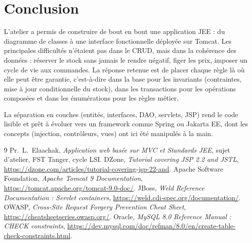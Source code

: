 \documentclass[11pt,a4paper]{report}
\begin{document}
\chapter*{Conclusion}
L'atelier a permis de construire de bout en bout une application JEE : du diagramme de classes \`a une interface fonctionnelle d\'eploy\'ee sur Tomcat. Les principales difficult\'es n'\'etaient pas dans le CRUD, mais dans la coh\'erence des donn\'ees : r\'eserver le stock sans jamais le rendre n\'egatif, figer les prix, imposer un cycle de vie aux commandes. La r\'eponse retenue est de placer chaque r\`egle l\`a o\`u elle peut \^etre garantie, c'est-\`a-dire dans la base pour les invariants (contraintes, mise \`a jour conditionnelle du stock), dans les transactions pour les op\'erations compos\'ees et dans les \'enum\'erations pour les r\`egles m\'etier.

La s\'eparation en couches (entit\'es, interfaces, DAO, servlets, JSP) rend le code lisible et pr\^et \`a \'evoluer vers un framework comme Spring ou Jakarta EE, dont les concepts (injection, contr\^oleurs, vues) ont ici \'et\'e manipul\'es \`a la main.

\begin{thebibliography}{9}
 Pr.\ L.\ Elaachak, \emph{Application web bas\'ee sur MVC et Standards JEE}, sujet d'atelier, FST Tanger, cycle LSI.
 DZone, \emph{Tutorial covering JSP 2.2 and JSTL}, \url{https://dzone.com/articles/tutorial-covering-jsp-22-and}.
 Apache Software Foundation, \emph{Apache Tomcat 9 Documentation}, \url{https://tomcat.apache.org/tomcat-9.0-doc/}.
 JBoss, \emph{Weld Reference Documentation : Servlet containers}, \url{https://weld.cdi-spec.org/documentation/}.
 OWASP, \emph{Cross-Site Request Forgery Prevention Cheat Sheet}, \url{https://cheatsheetseries.owasp.org/}.
 Oracle, \emph{MySQL 8.0 Reference Manual : CHECK constraints}, \url{https://dev.mysql.com/doc/refman/8.0/en/create-table-check-constraints.html}.
\end{thebibliography}

\appendix
\end{document}
